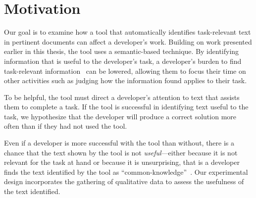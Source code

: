 


\section{Motivation}
\label{cp6:method}



Our goal is to examine how a tool that 
automatically identifies
task-relevant text in pertinent
documents  can affect a developer's work.
Building on work presented earlier in this
thesis, the tool uses a semantic-based technique.
By identifying information that is useful to the developer's task,
a developer's burden to find task-relevant information~\cite{Robillard2015}
can be lowered,
allowing them to focus their time on other activities such as judging how the information found applies to their task.


To be helpful, the tool must direct a developer's attention to text that assists them to complete a task.
If the tool is successful in identifying text useful to the task, we hypothesize that
the developer will produce a correct solution more often than if they had not used the tool.





Even if a developer is more successful
with the tool than without, there is a chance that the text shown by the tool is not \textit{useful}---either because it is not relevant for the task at hand or because it is unsurprising, that is
a developer finds the text identified by the tool as ``common-knowledge''~\cite{cwalina2008, Robillard2015}. Our experimental design incorporates the gathering of qualitative data to assess the usefulness of the text identified.

 




